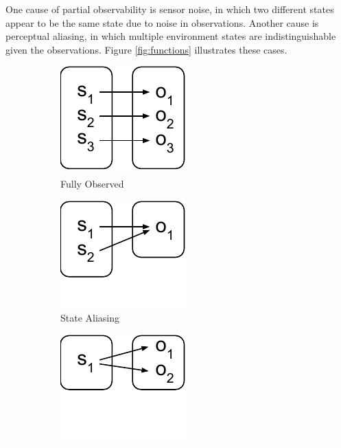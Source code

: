 \documentclass{article} %
\theoremstyle{definition}
\begin{document}
One cause of partial observability is sensor noise, in which two
different states appear to be the same state due to noise in
observations. Another cause is perceptual aliasing, in which multiple
environment states are indistinguishable given the
observations. Figure \ref{fig:functions} illustrates these cases.

\begin{figure}[htp]
\centering
\begin{subfigure}{.3\textwidth}
  \centering
  \includegraphics[width=.6\linewidth]{figures/bijection}
  \caption{Fully Observed}
  \label{fig:bijection}
\end{subfigure}
\begin{subfigure}{.3\textwidth}
  \centering
  \includegraphics[width=.6\linewidth]{figures/state-aliasing}
  \caption{State Aliasing}
  \label{fig:state-aliasing}
\end{subfigure}
\begin{subfigure}{.3\textwidth}
  \centering
  \includegraphics[width=.6\linewidth]{figures/noisy-perception}

\end{subfigure}
\end{figure}
\end{document}
